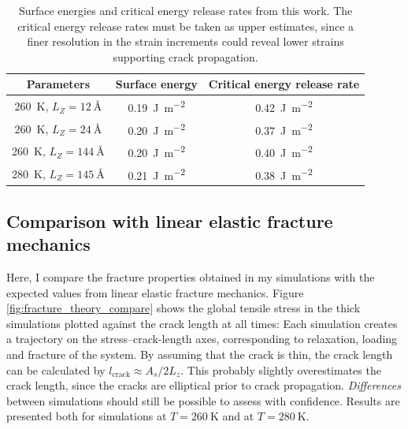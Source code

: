 \begin{table}
\centering
\caption{Surface energies and critical energy release rates from this work. The critical energy release rates must be taken as upper estimates, since a finer resolution in the strain increments could reveal lower strains supporting crack propagation.}
\label{tbl:fracture_surface}
\begin{tabular}{c|c|c}
Parameters & Surface energy & Critical energy release rate \\
\hline
\SI{260}{\kelvin}, $L_Z = \SI{12}{\angstrom}$ &\SI{0.19}{\joule\per\meter\squared} & \SI{0.42}{\joule\per\meter\squared} \\
\SI{260}{\kelvin}, $L_Z = \SI{24}{\angstrom}$ &\SI{0.20}{\joule\per\meter\squared} & \SI{0.37}{\joule\per\meter\squared} \\
\SI{260}{\kelvin}, $L_Z = \SI{144}{\angstrom}$ & \SI{0.20}{\joule\per\meter\squared} & \SI{0.40}{\joule\per\meter\squared}\\
\SI{280}{\kelvin}, $L_Z = \SI{145}{\angstrom}$ & \SI{0.21}{\joule\per\meter\squared} & \SI{0.38}{\joule\per\meter\squared}
\end{tabular}
\end{table}

\subsection{Comparison with linear elastic fracture mechanics}
Here, I compare the fracture properties obtained in my simulations with the expected values from linear elastic fracture mechanics. 
Figure \ref{fig:fracture_theory_compare} shows the global tensile stress in the thick simulations plotted against the crack length at all times: Each simulation creates a trajectory on the stress--crack-length axes, corresponding to relaxation, loading and fracture of the system. By assuming that the crack is thin, the crack length can be calculated by $l_{\text{crack}} \approx A_s/2L_z$. This probably slightly overestimates the crack length, since the cracks are elliptical prior to crack propagation. \emph{Differences} between simulations should still be possible to assess with confidence. Results are presented both for simulations at $T= \SI{260}{\kelvin}$ and at $T=\SI{280}{\kelvin}$. 

